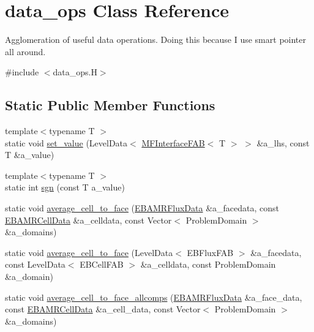 \hypertarget{classdata__ops}{}\section{data\+\_\+ops Class Reference}
\label{classdata__ops}


Agglomeration of useful data operations. Doing this because I use smart pointer all around.  




{\ttfamily \#include $<$data\+\_\+ops.\+H$>$}

\subsection*{Static Public Member Functions}
\begin{DoxyCompactItemize}
\item 
{\footnotesize template$<$typename T $>$ }\\static void \hyperlink{classdata__ops_a502bf2b3242965e9391276e5af3e26c0}{set\+\_\+value} (Level\+Data$<$ \hyperlink{classMFInterfaceFAB}{M\+F\+Interface\+F\+AB}$<$ T $>$ $>$ \&a\+\_\+lhs, const T \&a\+\_\+value)
\item 
{\footnotesize template$<$typename T $>$ }\\static int \hyperlink{classdata__ops_a904115cf676e5c8919d276b42f3d01d0}{sgn} (const T a\+\_\+value)
\item 
static void \hyperlink{classdata__ops_aa467374ebfcf82a71c097406bc02d2c8}{average\+\_\+cell\+\_\+to\+\_\+face} (\hyperlink{type__definitions_8H_aadad278b2e5d3d4abcf9032f90ba78c3}{E\+B\+A\+M\+R\+Flux\+Data} \&a\+\_\+facedata, const \hyperlink{type__definitions_8H_a7e610f301989e5e07781c5e338bdb7c3}{E\+B\+A\+M\+R\+Cell\+Data} \&a\+\_\+celldata, const Vector$<$ Problem\+Domain $>$ \&a\+\_\+domains)
\item 
static void \hyperlink{classdata__ops_afd89897717555384f6725916282a3b08}{average\+\_\+cell\+\_\+to\+\_\+face} (Level\+Data$<$ E\+B\+Flux\+F\+AB $>$ \&a\+\_\+facedata, const Level\+Data$<$ E\+B\+Cell\+F\+AB $>$ \&a\+\_\+celldata, const Problem\+Domain \&a\+\_\+domain)
\item 
static void \hyperlink{classdata__ops_aad0fe17067d441a22dfa257d24c08c23}{average\+\_\+cell\+\_\+to\+\_\+face\+\_\+allcomps} (\hyperlink{type__definitions_8H_aadad278b2e5d3d4abcf9032f90ba78c3}{E\+B\+A\+M\+R\+Flux\+Data} \&a\+\_\+face\+\_\+data, const \hyperlink{type__definitions_8H_a7e610f301989e5e07781c5e338bdb7c3}{E\+B\+A\+M\+R\+Cell\+Data} \&a\+\_\+cell\+\_\+data, const Vector$<$ Problem\+Domain $>$ \&a\+\_\+domains)

\end{DoxyCompactItemize}
